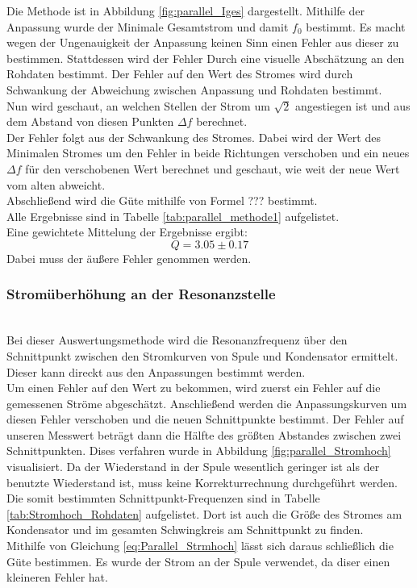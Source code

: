\documentclass[12pt,a4paper]{article}
\begin{document}
Die Methode ist in Abbildung \ref{fig:parallel_Iges} dargestellt.
Mithilfe der Anpassung wurde der Minimale Gesamtstrom und damit $f_0$ bestimmt. Es macht wegen der Ungenauigkeit der Anpassung keinen Sinn einen Fehler aus dieser zu bestimmen.  Stattdessen wird der Fehler Durch eine visuelle Abschätzung an den Rohdaten bestimmt.
Der Fehler auf den Wert des Stromes wird durch Schwankung der Abweichung zwischen Anpassung und Rohdaten bestimmt.\\
Nun wird geschaut, an welchen Stellen der Strom um $\sqrt{2}$ angestiegen ist und aus dem Abstand von diesen Punkten $\Delta f$ berechnet.\\
Der Fehler folgt aus der Schwankung des Stromes. Dabei wird der Wert des Minimalen Stromes um den Fehler in beide Richtungen verschoben und ein neues $\Delta f$ für den verschobenen Wert berechnet und geschaut, wie weit der neue Wert vom alten abweicht.\\
Abschließend wird die Güte mithilfe von Formel ??? bestimmt.\\
Alle Ergebnisse sind in Tabelle \ref{tab:parallel_methode1} aufgelistet.\\
Eine gewichtete Mittelung der Ergebnisse ergibt:
\begin{equation}
Q = 3.05\pm 0.17 
\end{equation}
Dabei muss der äußere Fehler genommen werden.

\subsubsection{Stromüberhöhung an der Resonanzstelle}\mbox{}\\
Bei dieser Auswertungsmethode wird die Resonanzfrequenz über den Schnittpunkt zwischen den Stromkurven von Spule und Kondensator ermittelt. Dieser kann direckt aus den Anpassungen bestimmt werden.\\
Um einen Fehler auf den Wert zu bekommen, wird zuerst ein Fehler auf die gemessenen Ströme abgeschätzt. Anschließend werden die Anpassungskurven um diesen Fehler verschoben und die neuen Schnittpunkte bestimmt. Der Fehler auf unseren Messwert beträgt dann die Hälfte des größten Abstandes zwischen zwei Schnittpunkten. Dises verfahren wurde in Abbildung \ref{fig:parallel_Stromhoch} visualisiert.
Da der Wiederstand in der Spule wesentlich geringer ist als der benutzte Wiederstand ist, muss keine Korrekturrechnung durchgeführt werden.\\
Die somit bestimmten Schnittpunkt-Frequenzen sind in Tabelle \ref{tab:Stromhoch_Rohdaten} aufgelistet. Dort ist auch die Größe des Stromes am Kondensator und im gesamten Schwingkreis am Schnittpunkt zu finden. \\
Mithilfe von Gleichung \ref{eq:Parallel_Strmhoch} lässt sich daraus schließlich die Güte bestimmen. Es wurde der Strom an der Spule verwendet, da diser einen kleineren Fehler hat.
\end{document}
